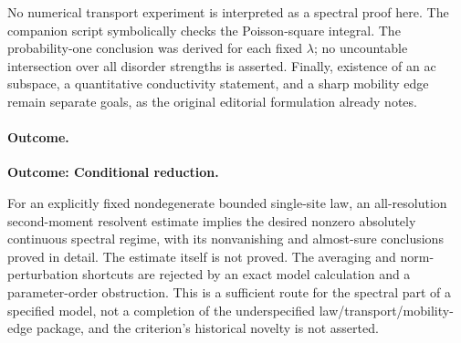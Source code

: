 \documentclass[11pt,a4paper]{article}
\numberwithin{equation}{section}
\begin{document}
No numerical transport experiment is interpreted as a spectral proof here.
The companion script symbolically checks the Poisson-square integral.
The probability-one conclusion was derived for each fixed $\lambda$; no
uncountable intersection over all disorder strengths is asserted. Finally,
existence of an ac subspace, a quantitative conductivity statement, and a
sharp mobility edge remain separate goals, as the original editorial
formulation already notes.

\paragraph{Outcome.}
\textbf{Outcome: Conditional reduction.}

For an explicitly fixed nondegenerate bounded single-site law, an
all-resolution second-moment resolvent estimate implies the desired
nonzero absolutely continuous spectral regime, with its nonvanishing and
almost-sure conclusions proved in detail. The estimate itself is not proved.
The averaging and norm-perturbation shortcuts are rejected by an exact model
calculation and a parameter-order obstruction. This is a sufficient route
for the spectral part of a specified model, not a completion of the
underspecified law/transport/mobility-edge package, and the criterion's
historical novelty is not asserted.

\end{document}
